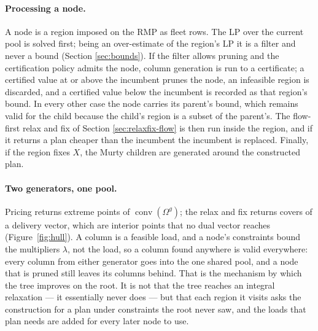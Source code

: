 \paragraph{Processing a node.}
A node is a region imposed on the RMP as fleet rows. The LP over the
current pool is solved first; being an over-estimate of the region's LP
it is a filter and never a bound (Section \ref{sec:bounds}). If the
filter allows pruning and the certification policy admits the node,
column generation is run to a certificate; a certified value at or
above the incumbent prunes the node, an infeasible region is discarded,
and a certified value below the incumbent is recorded as that region's
bound. In every other case the node carries its parent's bound, which
remains valid for the child because the child's region is a subset of
the parent's. The flow-first relax and fix of Section
\ref{sec:relaxfix-flow} is then run inside the region, and if it returns
a plan cheaper than the incumbent the incumbent is replaced. Finally, if
the region fixes $X$, the Murty children are generated around the
constructed plan.

\paragraph{Two generators, one pool.}
Pricing returns extreme points of $\operatorname{conv}(\Omega^{g})$; the
relax and fix returns covers of a delivery vector, which are interior
points that no dual vector reaches (Figure~\ref{fig:hull}). A column is
a feasible load, and a node's constraints bound the multipliers
$\lambda$, not the load, so a column found anywhere is valid everywhere:
every column from either generator goes into the one shared pool, and a
node that is pruned still leaves its columns behind. That is the
mechanism by which the tree improves on the root. It is not that the
tree reaches an integral relaxation --- it essentially never does ---
but that each region it visits asks the construction for a plan under
constraints the root never saw, and the loads that plan needs are added
for every later node to use.

